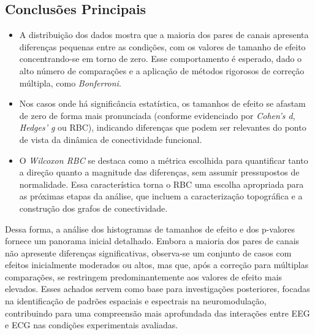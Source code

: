 \subsection{Conclusões Principais}
\begin{itemize}
    \item A distribuição dos dados mostra que a maioria dos pares de canais apresenta diferenças pequenas entre as condições, com os valores de tamanho de efeito concentrando-se em torno de zero. Esse comportamento é esperado, dado o alto número de comparações e a aplicação de métodos rigorosos de correção múltipla, como \textit{Bonferroni}.
    
    \item Nos casos onde há significância estatística, os tamanhos de efeito se afastam de zero de forma mais pronunciada (conforme evidenciado por \textit{Cohen's d}, \textit{Hedges' g} ou RBC), indicando diferenças que podem ser relevantes do ponto de vista da dinâmica de conectividade funcional.

    \item O \textit{Wilcoxon RBC} se destaca como a métrica escolhida para quantificar tanto a direção quanto a magnitude das diferenças, sem assumir pressupostos de normalidade. Essa característica torna o RBC uma escolha apropriada para as próximas etapas da análise, que incluem a caracterização topográfica e a construção dos grafos de conectividade.

\end{itemize}

Dessa forma, a análise dos histogramas de tamanhos de efeito e dos p-valores fornece um panorama inicial detalhado. Embora a maioria dos pares de canais não apresente diferenças significativas, observa-se um conjunto de casos com efeitos inicialmente moderados ou altos, mas que, após a correção para múltiplas comparações, se restringem predominantemente aos valores de efeito mais elevados. Esses achados servem como base para investigações posteriores, focadas na identificação de padrões espaciais e espectrais na neuromodulação, contribuindo para uma compreensão mais aprofundada das interações entre EEG e ECG nas condições experimentais avaliadas.


